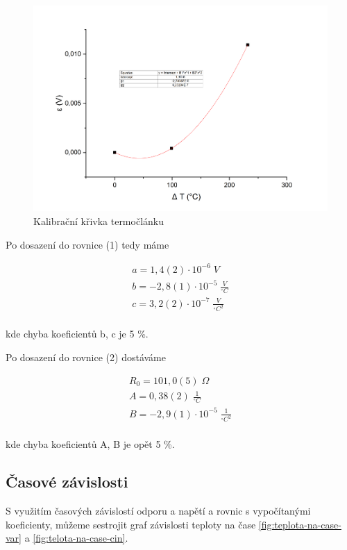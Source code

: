 \begin{figure}[h]
    \centering
    \includegraphics[width=0.8\linewidth]{8 - Kalibrace odporového teploměru a termočlánku//Prototkol - kalibrace teploměru//img/Závislost epsilon na delta T, parabola.png}
    \caption{Kalibrační křivka termočlánku}
    \label{fig:krivka-termoclanek}
\end{figure}

Po dosazení do rovnice (1) tedy máme

\begin{align*}
    a = 1,4(2) \cdot 10^{-6} \; V\\
    b = -2,8(1) \cdot 10^{-5} \; \frac{V}{^\circ C}\\
    c = 3,2(2) \cdot 10^{-7} \; \frac{V}{^\circ C^2} \\
\end{align*}

kde chyba koeficientů b, c je 5 \%.

Po dosazení do rovnice (2) dostáváme

\begin{align*}
    R_0 = 101,0(5) \; \Omega \\
    A = 0,38(2) \; \frac{1}{^\circ C} \\
    B = -2,9(1) \cdot 10^{-5} \; \frac{1}{^\circ C^2} \\
\end{align*}

kde chyba koeficientů A, B je opět 5 \%.
\newpage
\subsection{Časové závislosti}

S využitím časových závislostí odporu a napětí a rovnic s vypočítanými koeficienty, můžeme sestrojit graf závislosti teploty na čase \ref{fig:teplota-na-case-var} a \ref{fig:telota-na-case-cin}.

